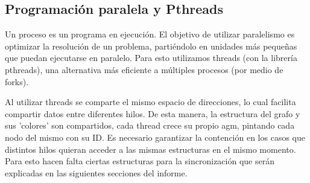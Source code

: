 \subsection{Programación paralela y Pthreads}

Un proceso es un programa en ejecución. El objetivo de utilizar paralelismo es optimizar la resolución de un problema, partiéndolo en unidades más pequeñas que puedan ejecutarse en paralelo. Para esto utilizamos threads (con la librería pthreads), una alternativa más eficiente a múltiples procesos (por medio de forks).

Al utilizar threads se comparte el mismo espacio de direcciones, lo cual facilita compartir datos entre diferentes hilos. De esta manera, la estructura del grafo y sus 'colores' son compartidos, cada thread crece su propio agm, pintando cada nodo del mismo con su ID. Es necesario garantizar la contención en los casos que distintos hilos quieran acceder a las mismas estructuras en el mismo momento. Para esto hacen falta ciertas estructuras para la sincronización que serán explicadas en las siguientes secciones del informe.